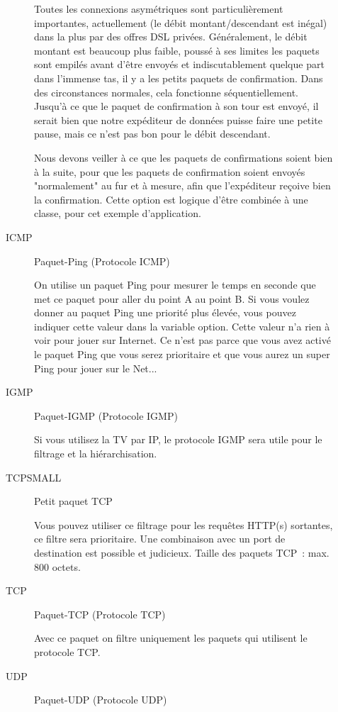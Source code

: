 \begin{description}
\begin{description}
    Toutes les connexions asymétriques sont particulièrement importantes,
    actuellement (le débit montant/descendant est inégal) dans la plus par
    des offres DSL privées. Généralement, le débit montant est beaucoup plus
    faible, poussé à ses limites les paquets sont empilés avant d'être envoyés
    et indiscutablement quelque part dans l'immense tas, il y a les petits
    paquets de confirmation. Dans des circonstances normales, cela fonctionne
    séquentiellement. Jusqu'à ce que le paquet de confirmation à son tour
    est envoyé, il serait bien que notre expéditeur de données puisse faire une
    petite pause, mais ce n'est pas bon pour le débit descendant.

    Nous devons veiller à ce que les paquets de confirmations soient bien à la
    suite, pour que les paquets de confirmation soient envoyés "normalement" au
    fur et à mesure, afin que l'expéditeur reçoive bien la confirmation. Cette
    option est logique d'être combinée à une classe, pour cet exemple d'application.

  \item[ICMP] Paquet-Ping (Protocole ICMP)

    On utilise un paquet Ping pour mesurer le temps en seconde que met ce paquet
    pour aller du point A au point B. Si vous voulez donner au paquet Ping une
    priorité plus élevée, vous pouvez indiquer cette valeur dans la variable
    option. Cette valeur n'a rien à voir pour jouer sur Internet. Ce n'est pas
    parce que vous avez activé le paquet Ping que vous serez prioritaire et que
    vous aurez un super Ping pour jouer sur le Net...

  \item[IGMP] Paquet-IGMP (Protocole IGMP)

    Si vous utilisez la TV par IP, le protocole IGMP sera utile pour le filtrage
    et la hiérarchisation.

  \item[TCPSMALL] Petit paquet TCP

    Vous pouvez utiliser ce filtrage pour les requêtes HTTP(s) sortantes, ce
    filtre sera prioritaire. Une combinaison avec un port de destination est
    possible et judicieux. Taille des paquets TCP~: max. 800 octets.

  \item[TCP] Paquet-TCP (Protocole TCP)

    Avec ce paquet on filtre uniquement les paquets qui utilisent le protocole TCP.

  \item[UDP] Paquet-UDP (Protocole UDP)


\end{description}
\end{description}
